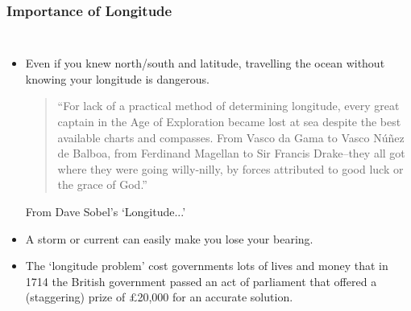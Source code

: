 \begin{frame}
\frametitle{Importance of Longitude}
\begin{columns}
	\begin{itemize}
		\item Even if you knew north/south and latitude, travelling the ocean without knowing your longitude is dangerous.

		\begin{flushleft}\small
			\begin{quotation}
				``For lack of a practical method of determining longitude, every great captain in the Age of Exploration became lost at sea despite the best available charts and compasses. From Vasco da Gama to Vasco N\'u\~{n}ez de Balboa, from Ferdinand Magellan to Sir Francis Drake--they all got where they were going willy-nilly, by forces attributed to good luck or the grace of God.''
			\end{quotation}
			\hfill From Dave Sobel's `Longitude...'~\cite{Sobel1995}
		\end{flushleft}
		\item A storm or current can easily make you lose your bearing.
		\item The `longitude problem' cost governments lots of lives and money that in 1714 the British government passed an act of parliament that offered a (staggering) prize of \pounds20,000 for an accurate solution.
	\end{itemize}
	\medskip
\end{columns}
\end{frame}


